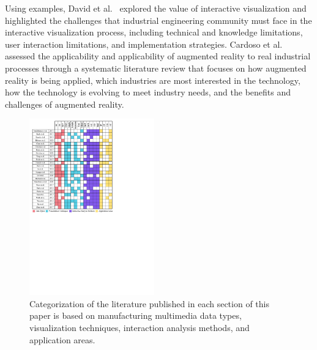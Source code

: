 \documentclass[a4paper,fleqn]{cas-dc}
\begin{document}
Using examples, David et al.~\cite{font2019interactive} explored the value of interactive visualization and highlighted the challenges that industrial engineering community must face in the interactive visualization process, including technical and knowledge limitations, user interaction limitations, and implementation strategies. 
Cardoso et al.~\cite{de2020survey} assessed the applicability and applicability of augmented reality to real industrial processes through a systematic literature review that focuses on how augmented reality is being applied, which industries are most interested in the technology, how the technology is evolving to meet industry needs, and the benefits and challenges of augmented reality.    

\begin{figure}[t]
	\centering
	\vspace{.5em}
	\includegraphics[width=0.48\textwidth]{Images/table.pdf}
	\caption{Categorization of the literature published in each section of this paper is based on manufacturing multimedia data types, visualization techniques, interaction analysis methods, and application areas.}
	\vspace{-1em}
	\label{fig:Classification_Coordinate}
\end{figure}

\end{document}
